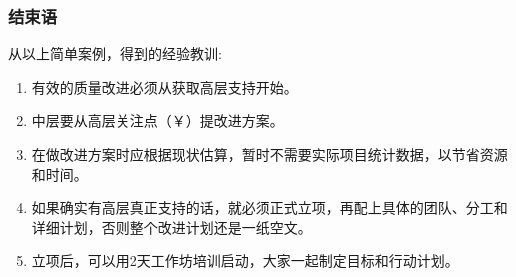 \hypertarget{ux603bux7ed3}{%
\subsubsection{结束语}\label{ux603bux7ed3}}

从以上简单案例，得到的经验教训:\\

\begin{enumerate}
\tightlist
\item
  有效的质量改进必须从获取高层支持开始。
\item
  中层要从高层关注点（￥）提改进方案。
\item
  在做改进方案时应根据现状估算，暂时不需要实际项目统计数据，以节省资源和时间。
\item
  如果确实有高层真正支持的话，就必须正式立项，再配上具体的团队、分工和详细计划，否则整个改进计划还是一纸空文。
\item
  立项后，可以用2天工作坊培训启动，大家一起制定目标和行动计划。
\end{enumerate}




